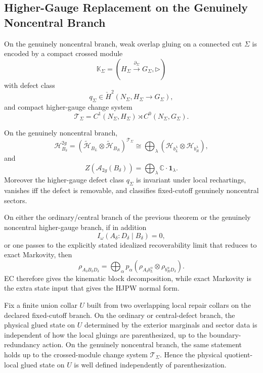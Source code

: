 \subsection{Higher-Gauge Replacement on the Genuinely Noncentral Branch}

\begin{proposition}
On the genuinely noncentral branch, weak overlap gluing on a connected cut \(\Sigma\) is encoded
by a compact crossed module
\[
\mathbb K_\Sigma=(H_\Sigma\xrightarrow{\partial_\Sigma}G_\Sigma,\triangleright)
\]
with defect class
\[
q_\Sigma\in \check H^2(N_\Sigma,H_\Sigma\to G_\Sigma),
\]
and compact higher-gauge change system
\[
\mathcal T_\Sigma=C^1(N_\Sigma,H_\Sigma)\rtimes C^0(N_\Sigma,G_\Sigma).
\]
\end{proposition}

\begin{theorem}
On the genuinely noncentral branch,
\[
\mathcal H_{B_\delta}^{2g}
=
(\tilde{\mathcal H}_{B_L}\otimes \tilde{\mathcal H}_{B_R})^{\mathcal T_\Sigma}
\cong
\bigoplus_\lambda
(\mathcal H_{b_L^\lambda}\otimes \mathcal H_{b_R^\lambda}),
\]
and
\[
Z(\mathcal A_{2g}(B_\delta))
=
\bigoplus_\lambda \mathbb C\cdot \mathbf 1_\lambda.
\]
Moreover the higher-gauge defect class \(q_\Sigma\) is invariant under local rechartings, vanishes
iff the defect is removable, and classifies fixed-cutoff genuinely noncentral sectors.
\end{theorem}

\begin{corollary}
On either the ordinary/central branch of the previous theorem or the genuinely noncentral
higher-gauge branch, if in addition
\[
I_\omega(A_\delta:D_\delta\mid B_\delta)=0,
\]
or one passes to the explicitly stated idealized recoverability limit that reduces to exact
Markovity, then
\[
\rho_{A_\delta B_\delta D_\delta}
=
\bigoplus_\alpha p_\alpha
\left(\rho_{A_\delta b_L^\alpha}\otimes \rho_{b_R^\alpha D_\delta}\right).
\]
EC therefore gives the kinematic block decomposition, while exact Markovity is the extra state
input that gives the HJPW normal form.
\end{corollary}

\begin{proposition}\label{prop:assocglue}
Fix a finite union collar \(U\) built from two overlapping local repair collars on the declared
fixed-cutoff branch. On the ordinary or central-defect branch, the physical glued state on \(U\)
determined by the exterior marginals and sector data is independent of how the local gluings are
parenthesized, up to the boundary-redundancy action. On the genuinely noncentral branch, the same
statement holds up to the crossed-module change system \(\mathcal T_\Sigma\). Hence the physical
quotient-local glued state on \(U\) is well defined independently of parenthesization.
\end{proposition}

